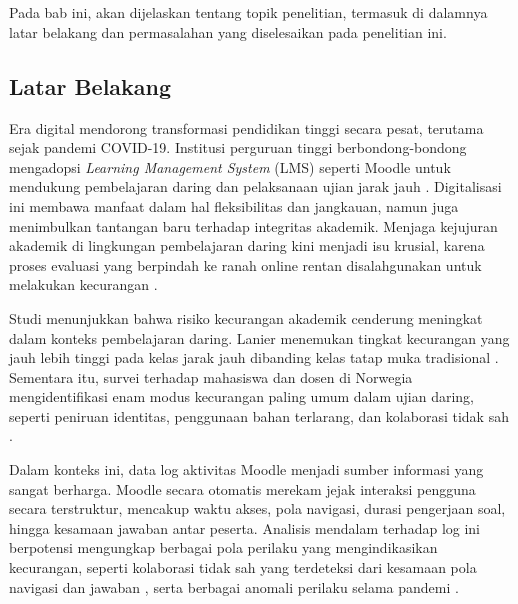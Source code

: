 \chapter{\babSatu}
\label{bab:1}
Pada bab ini, akan dijelaskan tentang topik penelitian, termasuk di dalamnya latar belakang dan permasalahan yang diselesaikan pada penelitian ini. 

\section{Latar Belakang}
\label{sec:latarBelakang}

Era digital mendorong transformasi pendidikan tinggi secara pesat, terutama sejak pandemi COVID-19. Institusi perguruan tinggi berbondong-bondong mengadopsi \textit{Learning Management System} (LMS) seperti Moodle untuk mendukung pembelajaran daring dan pelaksanaan ujian jarak jauh \cite{Yulita2023}. Digitalisasi ini membawa manfaat dalam hal fleksibilitas dan jangkauan, namun juga menimbulkan tantangan baru terhadap integritas akademik. Menjaga kejujuran akademik di lingkungan pembelajaran daring kini menjadi isu krusial, karena proses evaluasi yang berpindah ke ranah online rentan disalahgunakan untuk melakukan kecurangan \cite{Kamalov2021}.

Studi menunjukkan bahwa risiko kecurangan akademik cenderung meningkat dalam konteks pembelajaran daring. Lanier menemukan tingkat kecurangan yang jauh lebih tinggi pada kelas jarak jauh dibanding kelas tatap muka tradisional \cite{Lanier2006}. Sementara itu, survei terhadap mahasiswa dan dosen di Norwegia mengidentifikasi enam modus kecurangan paling umum dalam ujian daring, seperti peniruan identitas, penggunaan bahan terlarang, dan kolaborasi tidak sah \cite{Chirumamilla2020}.

Dalam konteks ini, data log aktivitas Moodle menjadi sumber informasi yang sangat berharga. Moodle secara otomatis merekam jejak interaksi pengguna secara terstruktur, mencakup waktu akses, pola navigasi, durasi pengerjaan soal, hingga kesamaan jawaban antar peserta. Analisis mendalam terhadap log ini berpotensi mengungkap berbagai pola perilaku yang mengindikasikan kecurangan, seperti kolaborasi tidak sah yang terdeteksi dari kesamaan pola navigasi dan jawaban \cite{Murdoch2019}, serta berbagai anomali perilaku selama pandemi \cite{Balderas2020}.

